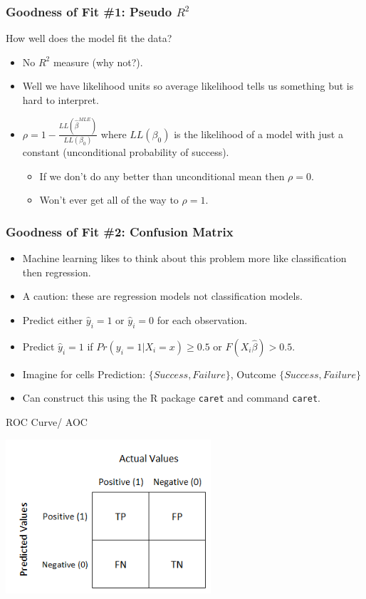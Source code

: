 \documentclass[aspectratio=169]{beamer}
\begin{document}
\begin{frame}
\frametitle{Goodness of Fit \#1: Pseudo $R^2$}
How well does the model fit the data?
\begin{itemize} 
\item No $R^2$ measure (why not?).
\item Well we have likelihood units so average likelihood tells us something but is hard to interpret.
\item $\rho = 1- \frac{LL(\hat{\beta}^{MLE})}{LL(\beta_0)}$ where $LL(\beta_0)$ is the likelihood of a model with just a constant (unconditional probability of success).
\begin{itemize}
\item If we don't do any better than unconditional mean then $\rho=0$.
\item Won't ever get all of the way to $\rho =1$.
\end{itemize}
\end{itemize}
\end{frame}

\begin{frame}
\frametitle{Goodness of Fit \#2: Confusion Matrix }
\begin{itemize} 
\item Machine learning likes to think about this problem more like \alert{classification} then regression.
\item A caution: these are \alert{regression} models not \alert{classification} models.
\item Predict either $\hat{y}_i = 1$ or $\hat{y}_i = 0$ for each observation.
\item Predict $\hat{y}_i =1$ if $Pr(y_i = 1 | X_i =x) \geq0.5$ or $F(X_i \hat{\beta}) > 0.5$.
\item Imagine for cells Prediction: $\{Success, Failure\}$, Outcome $\{Success, Failure\}$
\item Can construct this using the R package \texttt{caret} and command \texttt{caret}.
\end{itemize}
\end{frame}


\begin{frame}{ROC Curve/ AOC}
\begin{center}
\includegraphics[width=3in]{resources/confusion.png}\\
\end{center}
\end{frame}
\end{document}

